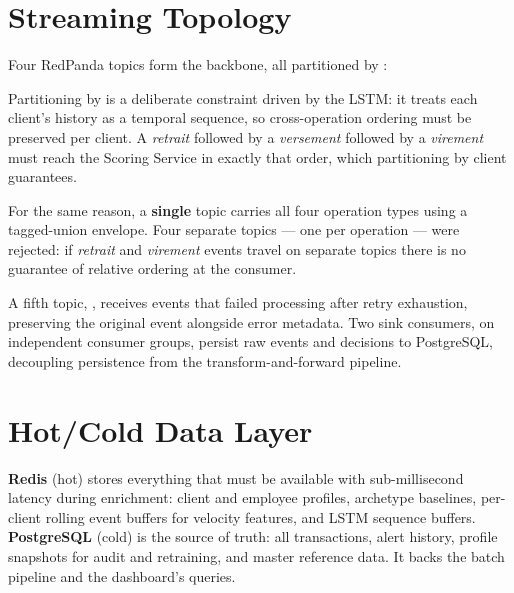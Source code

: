 \section{Streaming Topology}

Four RedPanda topics form the backbone, all partitioned by :

\begin{center}
\end{center}

Partitioning by  is a deliberate constraint driven by the LSTM: it treats each client's history as a temporal sequence, so cross-operation ordering must be preserved per client. A \emph{retrait} followed by a \emph{versement} followed by a \emph{virement} must reach the Scoring Service in exactly that order, which partitioning by client guarantees.

For the same reason, a \textbf{single}  topic carries all four operation types using a tagged-union envelope. Four separate topics --- one per operation --- were rejected: if \emph{retrait} and \emph{virement} events travel on separate topics there is no guarantee of relative ordering at the consumer.

A fifth topic, , receives events that failed processing after retry exhaustion, preserving the original event alongside error metadata. Two sink consumers, on independent consumer groups, persist raw events and decisions to PostgreSQL, decoupling persistence from the transform-and-forward pipeline.

\section{Hot/Cold Data Layer}

\textbf{Redis} (hot) stores everything that must be available with sub-millisecond latency during enrichment: client and employee profiles, archetype baselines, per-client rolling event buffers for velocity features, and LSTM sequence buffers. \textbf{PostgreSQL} (cold) is the source of truth: all transactions, alert history, profile snapshots for audit and retraining, and master reference data. It backs the batch pipeline and the dashboard's queries.

